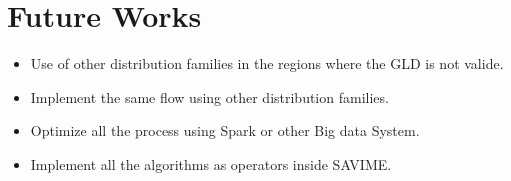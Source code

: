 \chapter[Future Works]{Future Works}\label{FutureWorks}

\begin{itemize}
\item Use of other distribution families in the regions where the GLD is not valide.
\item Implement the same flow using other distribution families.
\item Optimize all the process using Spark or other Big data System.
\item Implement all the algorithms as operators inside SAVIME.
\end{itemize}